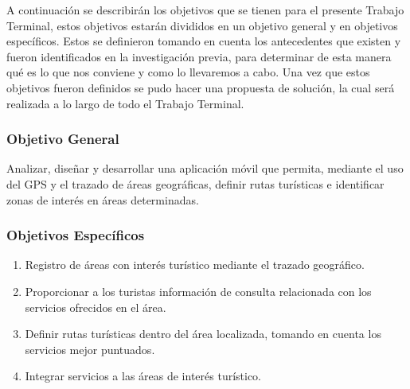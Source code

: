 \vspace*{7cm}
\rightline{{\Huge \textcolor{sectionColor}{Objetivos}}}
\vspace*{2cm}


A continuación se describirán los objetivos que se tienen para el presente Trabajo Terminal, estos objetivos estarán divididos en un objetivo general y en objetivos específicos. Estos se definieron tomando en cuenta los antecedentes que existen y fueron identificados en la investigación previa, para determinar de esta manera qué es lo que nos conviene y como lo llevaremos a cabo. Una vez que estos objetivos fueron definidos se pudo hacer una propuesta de solución, la cual será realizada a lo largo de todo el Trabajo Terminal.

\subsubsection{Objetivo General}

Analizar, diseñar y desarrollar una aplicación móvil que permita, mediante el uso del GPS y el trazado de áreas geográficas, definir rutas turísticas e identificar zonas de interés en áreas determinadas. 

\subsubsection{Objetivos Específicos}

\begin{enumerate}
	\item Registro de áreas con interés turístico mediante el trazado geográfico.
	
	\item Proporcionar a los turistas información de consulta relacionada con los servicios ofrecidos en el área.
	
	\item Definir rutas turísticas dentro del área localizada, tomando en cuenta los servicios mejor puntuados.
	
	\item Integrar servicios a las áreas de interés turístico.
\end{enumerate}

